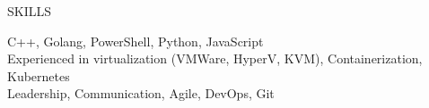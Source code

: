 \documentclass{resume} %
\begin{document}
\begin{rSection}{SKILLS}

C++, Golang, PowerShell, Python, JavaScript\\
Experienced in virtualization (VMWare, HyperV, KVM), Containerization, Kubernetes \\
Leadership, Communication, Agile, DevOps, Git

\end{rSection}
\end{document}
